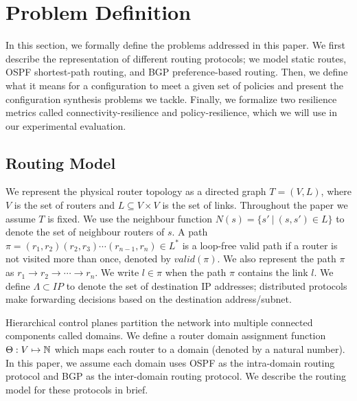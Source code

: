 \section{Problem Definition}
In this section, we formally define the problems addressed in this
paper.  We first describe the representation of different
routing protocols; we model static
routes, OSPF shortest-path routing, and BGP preference-based routing.
Then, we define what it means for a configuration to meet a given
set of policies and present the configuration synthesis problems
we tackle.
Finally, we formalize two resilience metrics called 
connectivity-resilience and policy-resilience,
which we will use in our experimental evaluation.

\subsection{Routing Model} \label{sec:routingmodel}

We represent the physical router topology as a directed graph $T=(V, L)$,
where $V$ is the set of routers and $L\subseteq V\times V$ is the set of links. 
Throughout the paper we assume $T$ is fixed.
We use the neighbour function $N(s) = \{s'\ | \ (s,s') \in L \}$ to denote 
the set of neighbour routers of $s$. 
A path $\pi = (r_1,r_2) (r_2, r_3) \cdots (r_{n-1}, r_n) \in L^*$ is a 
loop-free valid path if
a router is not visited more than once, denoted by $valid(\pi)$.
We also represent the path $\pi$ as 
$r_1\rightarrow r_2 \rightarrow  \cdots \rightarrow r_n$.
We write $l \in \pi$ when the path $\pi$ contains the link $l$. 
We define $\Lambda \subset IP$ to denote the set of 
destination IP addresses;
distributed protocols make forwarding decisions based on the 
destination address/subnet.

Hierarchical control planes partition the
network into multiple connected components called domains. 
We define a router domain assignment function
$\Theta: V \mapsto \mathbb{N}$ which maps each router to a domain 
(denoted by a natural number). In this paper, we assume 
each domain uses OSPF as the intra-domain routing protocol
and BGP as the inter-domain routing protocol. 
We describe the routing model for these protocols in brief.


